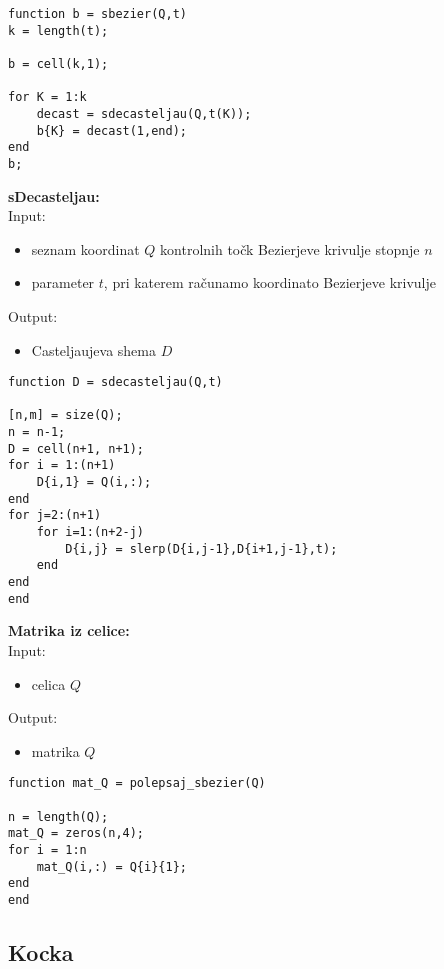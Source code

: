\documentclass[12pt,a4paper,twoside]{article}
\theoremstyle{definition} %
\theoremstyle{plain} %
\numberwithin{equation}{section}  %
\begin{document}
\begin{lstlisting}[caption = {sbezier}]
function b = sbezier(Q,t)
k = length(t);

b = cell(k,1);

for K = 1:k
    decast = sdecasteljau(Q,t(K));
    b{K} = decast(1,end);
end
b;
\end{lstlisting}

\vspace{0.5cm}
\textbf{sDecasteljau:}\\
Input:
\begin{itemize}
\item seznam koordinat $Q$ kontrolnih točk Bezierjeve krivulje stopnje $n$
\item parameter $t$, pri katerem računamo koordinato Bezierjeve krivulje
\end{itemize}
Output:
\begin{itemize}
\item Casteljaujeva shema $D$
\end{itemize}

\begin{lstlisting}[caption = {sdecasteljau}]
function D = sdecasteljau(Q,t)

[n,m] = size(Q);
n = n-1;
D = cell(n+1, n+1);
for i = 1:(n+1)
    D{i,1} = Q(i,:);
end
for j=2:(n+1)
    for i=1:(n+2-j)
        D{i,j} = slerp(D{i,j-1},D{i+1,j-1},t);
    end
end
end
\end{lstlisting}

\textbf{Matrika iz celice:}\\
Input:
\begin{itemize}
\item celica $Q$
\end{itemize}
Output:
\begin{itemize}
\item matrika $Q$
\end{itemize}

\begin{lstlisting}[caption = {polepsaj\_sbezier}]
function mat_Q = polepsaj_sbezier(Q)

n = length(Q);
mat_Q = zeros(n,4);
for i = 1:n
    mat_Q(i,:) = Q{i}{1};
end
end
\end{lstlisting}

\newpage

\subsection{Kocka}
\end{document}
